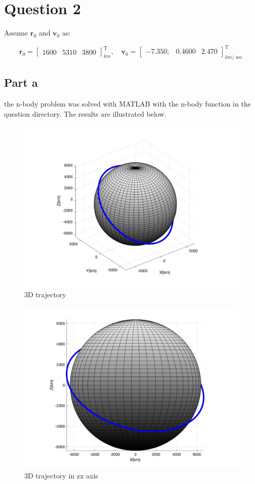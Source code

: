 \section{Question 2}
Assume $\boldsymbol{r}_0$ and $\boldsymbol{v}_0$ as:


$$
\boldsymbol{r}_0 = \begin{bmatrix}
    1600 & 5310 & 3800
\end{bmatrix}^{\textrm{T}}_{km}, \quad
\boldsymbol{v}_0 = \begin{bmatrix}
    -7.350; & 0.4600 & 2.470
\end{bmatrix}^{\textrm{T}}_{km/\sec}
$$

\subsection{Part a}
the n-body problem was solved with MATLAB with the n-body function in the question directory.
The results are illustrated below.
\begin{figure}[H]
    \caption{3D trajectory}
    \centering
    \includegraphics[width=16cm]{../Figure/Q2/3Dof_view}
\end{figure}

\begin{figure}[H]
    \caption{3D trajectory in zx axis}
    \centering
    \includegraphics[width=16cm]{../Figure/Q2/xz_view}
\end{figure}

